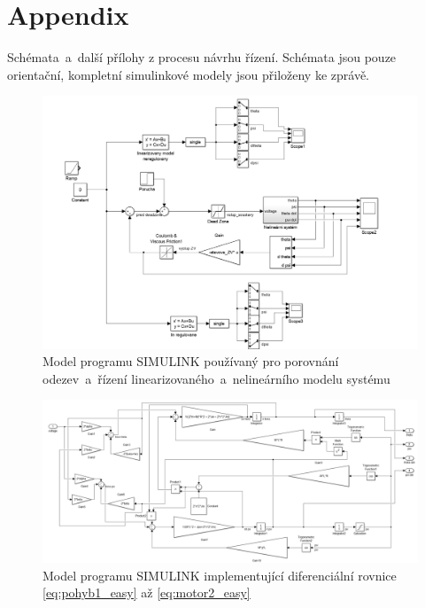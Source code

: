 \documentclass[conference]{IEEEtran}
\begin{document}
\section{Appendix}

Schémata~a~další přílohy z procesu návrhu řízení. Schémata jsou pouze orientační, kompletní simulinkové modely jsou přiloženy ke zprávě.

\begin{figure}[htbp]
    \centerline{\includegraphics[width=\linewidth]{simulace_simulink.png}}
    \caption{Model programu SIMULINK používaný pro porovnání odezev~a~řízení linearizovaného~a~nelineárního modelu systému}
    \label{fig:simulink_simulace}        
\end{figure}

\begin{figure}[htbp]
    \centerline{\includegraphics[width=\linewidth]{nelinearni_system_simulink.png}}
    \caption{Model programu SIMULINK implementující diferenciální rovnice \eqref{eq:pohyb1_easy} až \eqref{eq:motor2_easy}}
    \label{fig:simulink_nelin_model}        
\end{figure}
\end{document}
